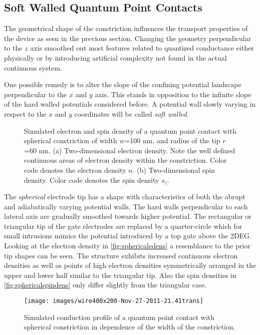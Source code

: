 \subsection{Soft Walled Quantum Point Contacts}
The geometrical shape of the constriction influences the transport properties of the device as seen in the previous section. Changing the geometry perpendicular to the $z$ axis smoothed out most features related to quantized conductance either physically or by introducing artificial complexity not found in the actual continuous system.\par
One possible remedy is to alter the slope of the confining potential landscape perpendicular to the $x$ and $y$ axis. This stands in opposition to the infinite slope of the hard walled potentials considered before. A potential wall slowly varying in respect to the $x$ and $y$ coordinates will be called \emph{soft walled}.\par
\begin{figure}[h]
\caption{Simulated electron and spin density of a quantum point contact with spherical constriction of width $w$=100 nm, and radius of the tip $r$=60 nm. (a) Two-dimensional electron density. Note the well defined continuous areas of electron density within the constriction. Color code denotes the electron density $n$. (b) Two-dimensional spin density. Color code denotes the spin density $s_z$.}
\end{figure}
The \emph{spherical} electrode tip has a shape with characteristics of both the abrupt and adiabatically varying potential walls. The hard walls perpendicular to each lateral axis are gradually smoothed towards higher potential. The rectangular or triangular tip of the gate electrodes are replaced by a quarter-circle which for small intrusions mimics the potential introduced by a top gate above the 2DEG. Looking at the electron density in \cref{fig:sphericaledens} a resemblance to the prior tip shapes can be seen. The structure exhibits increased continuous electron densities as well as points of high electron densities symmetrically arranged in the upper and lower half similar to the triangular tip. Also the spin densities in \cref{fig:sphericalspindens} only differ slightly from the triangular case.\par
\begin{figure}[h]
\centering
\texttt{[image: images/wire400x200-Nov-27-2011-21.41trans]}
\caption{Simulated conduction profile of a quantum point contact with spherical constriction in dependence of the width of the constriction.}\label{fig:sphericaltrans}
\end{figure}
